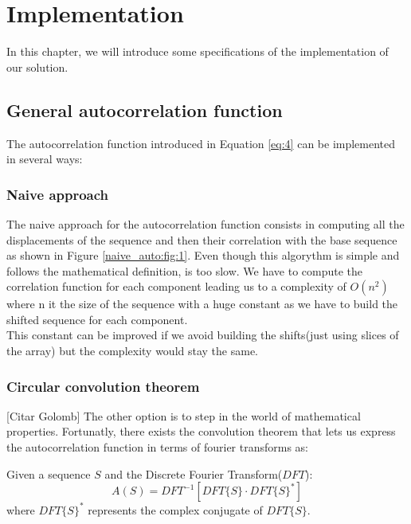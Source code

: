 \chapter{Implementation}
  In this chapter, we will introduce some specifications of the implementation
  of our solution.\\


  \section{General autocorrelation function}
    The autocorrelation function introduced in Equation \ref{eq:4} can be
    implemented in several ways:

      \subsection{Naive approach}
        The naive approach for the autocorrelation function consists in
        computing all the displacements of the sequence and then
        their correlation with the base sequence as shown in Figure
        \ref{naive_auto:fig:1}. Even though this algorythm is simple and follows
        the mathematical definition, is too slow. We have to compute the
        correlation function for each component leading us to a complexity of
        $O(n^{2})$ where n it the size of the sequence with a huge constant
        as we have to build the shifted sequence for each component.\\

        This constant can be improved if we avoid building the shifts(just
        using slices of the array) but the complexity would stay the same.

      \subsection{Circular convolution theorem}
        [Citar Golomb]
        The other option is to step in the world of mathematical properties.
        Fortunatly, there exists the convolution theorem that lets us express
        the autocorrelation function in terms of fourier transforms as:
        \begin{theorem}
          Given a sequence $S$ and the Discrete Fourier Transform($DFT$):
          \begin{equation}
            A(S) = DFT^{-1}[DFT\{S\} · DFT\{S\}^{*}]
          \end{equation}
          where $DFT\{S\}^{*}$ represents the complex conjugate of $DFT\{S\}$.
        \end{theorem}

